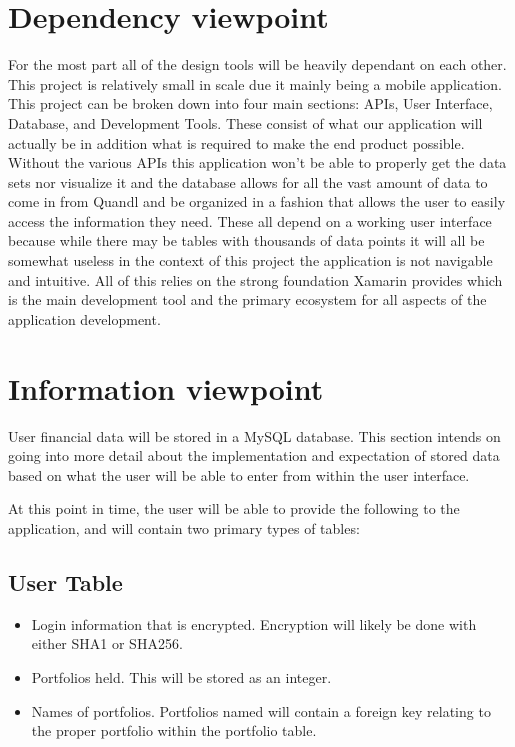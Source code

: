 \documentclass[onecolumn, draftclsnofoot,10pt, compsoc]{IEEEtran}
\begin{document}
\section{Dependency viewpoint}

      For the most part all of the design tools will be heavily dependant on each other. This project is relatively small in scale due it mainly being a mobile application. This project can be broken down into four main
      sections: APIs, User Interface, Database, and Development Tools. These consist of what our application will actually be in addition what is required to make the end product possible. Without the various APIs this
      application won't be able to properly get the data sets nor visualize it and the database allows for all the vast amount of data to come in from Quandl and be organized in a fashion that allows the user to easily access the
      information they need. These all depend on a working user interface because while there may be tables with thousands of data points it will all be somewhat useless in the context of this project the application is not
      navigable and intuitive. All of this relies on the strong foundation Xamarin provides which is the main development tool and the primary ecosystem for all aspects of the application development. 

\section{Information viewpoint}

        User financial data will be stored in a MySQL database. This section intends on going into more detail
        about the implementation and expectation of stored
        data based on what the user will be able to enter from within the user interface.

        At this point in time, the user will be able to provide the following to the application, and will contain two primary types of tables:

\subsection{User Table}
\begin{itemize}
    \item Login information that is encrypted. Encryption will likely be done with either SHA1 or SHA256.
    \item Portfolios held. This will be stored as an integer.
    \item Names of portfolios. Portfolios named will contain a foreign key relating to the proper portfolio within the portfolio table.
\end{itemize}
\end{document}
